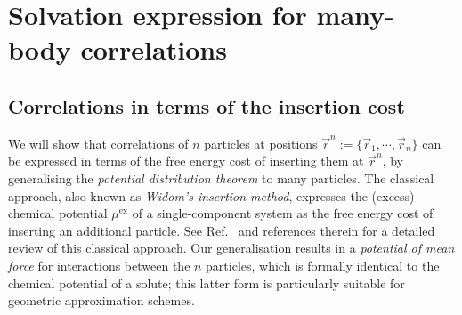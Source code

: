 \documentclass[11pt,twoside]{report}
\begin{document}
\section{Solvation expression for many-body correlations}
\label{sec:many-body-correlations}

\subsection{Correlations in terms of the insertion cost}

We will show that correlations of $n$ particles at positions $\vec{r}^n := \{\vec{r}_1, \cdots, \vec{r}_n\}$ can be expressed in terms of the free energy cost of inserting them at $\vec{r}^n$, by generalising the \emph{potential distribution theorem} \cite{WidomJCP1963,WidomJPC1982} to many particles.
The classical approach, also known as \emph{Widom's insertion method}, expresses the (excess) chemical potential $\mu^\mathrm{ex}$ of a single-component system as the free energy cost of inserting an additional particle.
See Ref.\ \cite{Rowlinson2002} and references therein for a detailed review of this classical approach.
Our generalisation results in a \emph{potential of mean force} for interactions between the $n$ particles, which is formally identical to the chemical potential of a solute; this latter form is particularly suitable for geometric approximation schemes.
\end{document}
